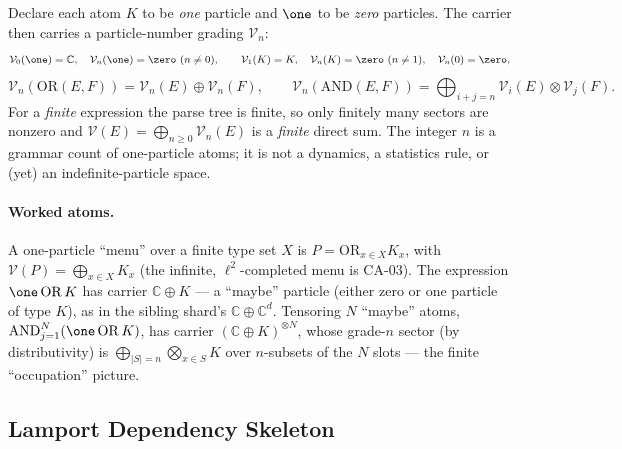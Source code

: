 Declare each atom $K$ to be \emph{one} particle and $\one$ to be \emph{zero}
particles. The carrier then carries a particle-number grading $\mathcal V_n$:
\[
  \mathcal V_0(\one)=\mathbb C,\quad
  \mathcal V_n(\one)=\zero\ (n\neq 0),\qquad
  \mathcal V_1(K)=K,\quad
  \mathcal V_n(K)=\zero\ (n\neq 1),\quad
  \mathcal V_n(0)=\zero,
\]
\[
  \mathcal V_n(\mathrm{OR}(E,F)) = \mathcal V_n(E)\oplus \mathcal V_n(F),
  \qquad
  \mathcal V_n(\mathrm{AND}(E,F)) = \bigoplus_{i+j=n}\mathcal V_i(E)\otimes \mathcal V_j(F).
\]
For a \emph{finite} expression the parse tree is finite, so only finitely many
sectors are nonzero and $\mathcal V(E)=\bigoplus_{n\ge 0}\mathcal V_n(E)$ is a
\emph{finite} direct sum. The integer $n$ is a grammar count of one-particle atoms;
it is not a dynamics, a statistics rule, or (yet) an indefinite-particle space.

\paragraph{Worked atoms.}
A one-particle ``menu'' over a finite type set $X$ is $P=\mathrm{OR}_{x\in X}K_x$,
with $\mathcal V(P)=\bigoplus_{x\in X}K_x$ (the infinite, $\ell^2$-completed menu is
CA-03). The expression $\one\,\mathrm{OR}\,K$ has
carrier $\mathbb C\oplus K$ --- a ``maybe'' particle (either zero or one particle
of type $K$), as in the sibling shard's $\mathbb C\oplus\mathbb C^d$.
Tensoring $N$ ``maybe'' atoms, $\mathrm{AND}_{j=1}^{N}(\one\,\mathrm{OR}\,K)$, has
carrier $(\mathbb C\oplus K)^{\otimes N}$, whose grade-$n$ sector (by
distributivity) is $\bigoplus_{|S|=n}\bigotimes_{x\in S}K$ over $n$-subsets of the
$N$ slots --- the finite ``occupation'' picture.

\subsection{Lamport Dependency Skeleton}

